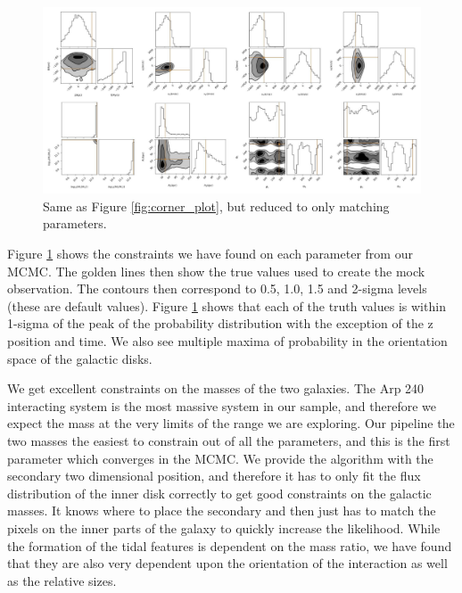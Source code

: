 \begin{figure}
    \centering
    \includegraphics[width=\textwidth]{Chapter1/figures/Arp240-red-corner.pdf}
    \caption{Same as Figure \ref{fig:corner_plot}, but reduced to only matching parameters.}
    \label{fig:arp240_corner_plot}
\end{figure}

Figure \ref{fig:arp240_corner_plot} shows the constraints we have found on each parameter from our MCMC. The golden lines then show the true values used to create the mock observation. The contours then correspond to 0.5, 1.0, 1.5 and 2-sigma levels (these are default values). Figure \ref{fig:arp240_corner_plot} shows that each of the truth values is within 1-sigma of the peak of the probability distribution with the exception of the z position and time. We also see multiple maxima of probability in the orientation space of the galactic disks.

We get excellent constraints on the masses of the two galaxies. The Arp 240 interacting system is the most massive system in our sample, and therefore we expect the mass at the very limits of the range we are exploring. Our pipeline the two masses the easiest to constrain out of all the parameters, and this is the first parameter which converges in the MCMC. We provide the algorithm with the secondary two dimensional position, and therefore it has to only fit the flux distribution of the inner disk correctly to get good constraints on the galactic masses. It knows where to place the secondary and then just has to match the pixels on the inner parts of the galaxy to quickly increase the likelihood. While the formation of the tidal features is dependent on the mass ratio, we have found that they are also very dependent upon the orientation of the interaction as well as the relative sizes.

